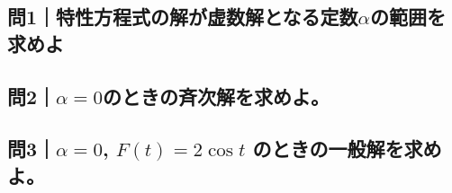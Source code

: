 \documentclass[a4paper,11pt]{bxjsarticle}
\begin{document}
\subsection{問1｜特性方程式の解が虚数解となる定数$\alpha$の範囲を求めよ}

\subsection{問2｜$\alpha=0$のときの斉次解を求めよ。}

\subsection{問3｜$\alpha=0$, $F(t)=2\cos t$ のときの一般解を求めよ。}




 
\end{document}
